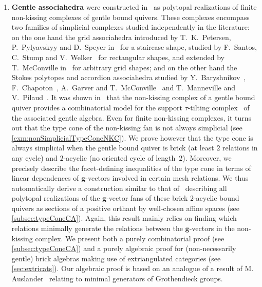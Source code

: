 \documentclass{amsart}
\theoremstyle{definition}
\renewcommand{\b}[1]{{\boldsymbol{#1}}} %
\begin{document}
\smallskip
\begin{enumerate}[$\quad\bullet$]
\item \textbf{Gentle associahedra} were constructed in~\cite{PaluPilaudPlamondon-nonkissing} as polytopal realizations of finite non-kissing complexes of gentle bound quivers.  These complexes encompass two families of simplicial complexes studied independently in the literature: on the one hand the grid associahedra introduced by T.~K.~Petersen, P.~Pylyavskyy and D.~Speyer in~\cite{PetersenPylyavskyySpeyer} for a staircase shape, studied by F.~Santos, C.~Stump and V.~Welker~\cite{SantosStumpWelker} for rectangular shapes, and extended by T.~McConville in~\cite{McConville} for arbitrary grid shapes; and on the other hand the Stokes polytopes and accordion associahedra studied by Y.~Baryshnikov~\cite{Baryshnikov}, F.~Chapoton~\cite{Chapoton-quadrangulations}, A.~Garver and T.~McConville~\cite{GarverMcConville} and T.~Manneville and V.~Pilaud~\cite{MannevillePilaud-accordion}. It was shown in~\cite{PaluPilaudPlamondon-nonkissing, BrustleDouvilleMousavandThomasYildirim} that the non-kissing complex of a gentle bound quiver provides a combinatorial model for the support $\tau$-tilting complex~\cite{AdachiIyamaReiten} of the associated gentle algebra. Even for finite non-kissing complexes, it turns out that the type cone of the non-kissing fan is not always simplicial (see \cref{exm:nonSimplicialTypeConeNKC}). We prove however that the type cone is always simplicial when the gentle bound quiver is brick (at least $2$ relations in any cycle) and $2$-acyclic (no oriented cycle of length~$2$). Moreover, we precisely describe the facet-defining inequalities of the type cone in terms of linear dependences of $\b{g}$-vectors involved in certain mesh relations. We thus automatically derive a construction similar to that of~\cite{ArkaniHamedBaiHeYan, BazierMatteDouvilleMousavandThomasYildirim} describing all polytopal realizations of the $\b{g}$-vector fans of these brick $2$-acyclic bound quivers as sections of a positive orthant by well-chosen affine spaces (see \cref{subsec:typeConeCA}). Again, this result mainly relies on finding which relations minimally generate the relations between the $\b{g}$-vectors in the non-kissing complex. We present both a purely combinatorial proof (see \cref{subsec:typeConeCA}) and a purely algebraic proof for (non-necessarily gentle) brick algebras making use of extriangulated categories (see \cref{sec:extricats}).
Our algebraic proof is based on an analogue of a result of M. Auslander~\cite{Auslander1984} relating to minimal generators of Grothendieck groups.

\end{enumerate}
\end{document}
